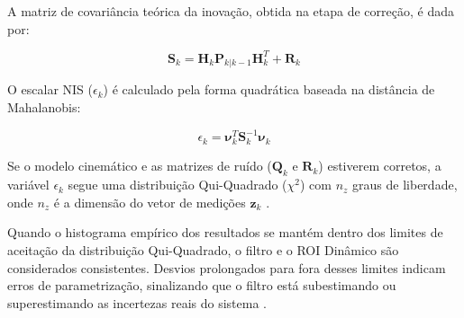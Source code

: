A matriz de covariância teórica da inovação, obtida na etapa de correção, é dada por:

\begin{equation}
    \label{eq:cov_inovacao}
    \mathbf{S}_k = \mathbf{H}_k \mathbf{P}_{k|k-1} \mathbf{H}_k^T + \mathbf{R}_k
\end{equation}

O escalar NIS ($\epsilon_k$) é calculado pela forma quadrática baseada na distância de Mahalanobis:

\begin{equation}
    \label{eq:nis}
    \epsilon_k = \boldsymbol{\nu}_k^T \mathbf{S}_k^{-1} \boldsymbol{\nu}_k
\end{equation}

Se o modelo cinemático e as matrizes de ruído ($\mathbf{Q}_k$ e $\mathbf{R}_k$) estiverem corretos, a variável $\epsilon_k$ segue uma distribuição Qui-Quadrado ($\chi^2$) com $n_z$ graus de liberdade, onde $n_z$ é a dimensão do vetor de medições $\mathbf{z}_k$ \cite{barshalom2001estimation}.

Quando o histograma empírico dos resultados se mantém dentro dos limites de aceitação da distribuição Qui-Quadrado, o filtro e o ROI Dinâmico são considerados consistentes. Desvios prolongados para fora desses limites indicam erros de parametrização, sinalizando que o filtro está subestimando ou superestimando as incertezas reais do sistema \cite{barshalom2001estimation}.
